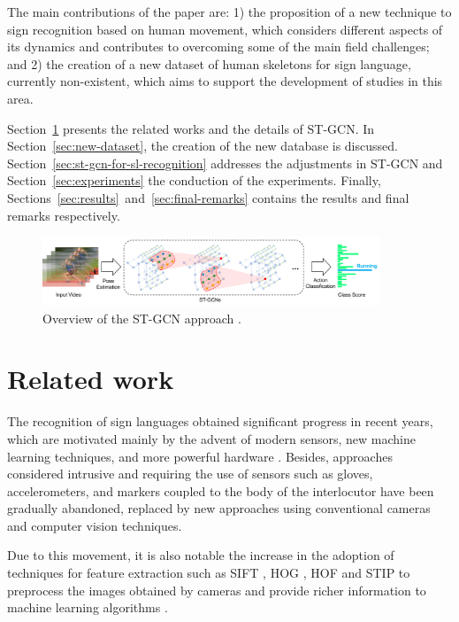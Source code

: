 The main contributions of the paper are: 1) the proposition of a new technique to sign recognition based on human movement, which considers different aspects of its dynamics and contributes to overcoming some of the main field challenges; and 2) the creation of a new dataset of human skeletons for sign language, currently non-existent, which aims to support the development of studies in this area.

Section~\ref{sec:related-work} presents the related works and the details of ST-GCN. In Section~\ref{sec:new-dataset},  the creation of the new database is discussed.
Section~\ref{sec:st-gcn-for-sl-recognition} addresses the adjustments in ST-GCN and Section~\ref{sec:experiments} the conduction of the experiments. Finally, Sections~\ref{sec:results}~and~\ref{sec:final-remarks} contains the results and final remarks respectively.

\begin{figure}[!ht]
    \centering
    \includegraphics[width=0.9\textwidth]{images/st_gcn_workflow}
    \caption{Overview of the ST-GCN approach \cite[p. 3]{st-gcn-2018}.}
    \label{fig:st-gcn-workflow}
\end{figure}


\section{Related work}
\label{sec:related-work}

The recognition of sign languages obtained significant progress in recent years, which are motivated mainly by the advent of modern sensors, new machine learning techniques, and more powerful hardware \cite{recent-advances-dl-2017, recent-advances-sl-2013}. Besides, approaches considered intrusive and requiring the use of sensors such as gloves, accelerometers, and markers coupled to the body of the interlocutor have been gradually abandoned, replaced by new approaches using conventional cameras and computer vision techniques.

Due to this movement, it is also notable the increase in the adoption of techniques for feature extraction such as SIFT \cite{lowe-2004}, HOG \cite{dalal-2005}, HOF \cite{laptev-2008} and STIP \cite{laptev-2008} to preprocess the images obtained by cameras and provide richer information to machine learning algorithms \cite{lim-2016, shanta-2018}.

